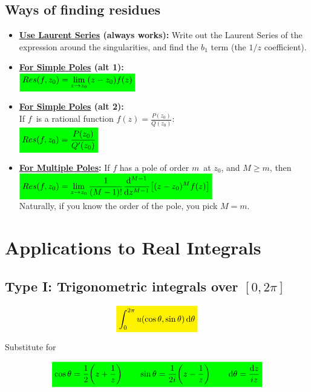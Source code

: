 \documentclass[10pt,a4paper]{article}
\newcommand{\yl}[1]{\colorbox{yellow}{$\displaystyle #1$}}
\newcommand{\gr}[1]{\colorbox{green}{$\displaystyle #1$}}
\begin{document}
\begin{multicols}{2}
\subsection*{Ways of finding residues}
\begin{itemize}
    \item \textbf{\underline{Use Laurent Series} (always works):} Write out the Laurent Series of the expression around the singularities, and find the $b_1$ term (the $1/z$ coefficient).
    \item \textbf{\underline{For Simple Poles} (alt 1):} \\
    $\gr{Res(f, z_0) = \lim\limits_{z\rightarrow z_0}(z-z_0)f(z)}$\\
    \item \textbf{\underline{For Simple Poles} (alt 2):}\\
    If $f$ is a rational function $f(z) = \frac{P(z_0)}{Q(z_0)}$:\\
    $\gr{Res(f,z_0) = \frac{P(z_0)}{Q'(z_0)}}$
    \item \textbf{\underline{For Multiple Poles}:} If $f$ has a pole of order $m$ at $z_0$, and $M\geq m$, then\\
    $\gr{Res(f,z_0) = \lim\limits_{z\rightarrow z_0} \frac{1}{(M-1)!} \dv[M-1]{z}\qty[(z-z_0)^M f(z)]}$
    \\
    Naturally, if you know the order of the pole, you pick $M=m$.
\end{itemize}





\section*{Applications to Real Integrals}
\subsection*{Type I: Trigonometric integrals over $[0, 2\pi]$}
\[\yl{
    \int_0^{2\pi} u(\cos{\theta}, \sin{\theta}) \dd{\theta}
}\]

Substitute for

\[\gr{
    \cos{\theta} = \dfrac{1}{2}\qty(z+\dfrac{1}{z}) \quad\quad \sin{\theta} = \dfrac{1}{2i}\qty(z-\dfrac{1}{z}) \quad\quad \dd{\theta} = \dfrac{\dd{z}}{iz}
}\]


\end{multicols}
\end{document}
